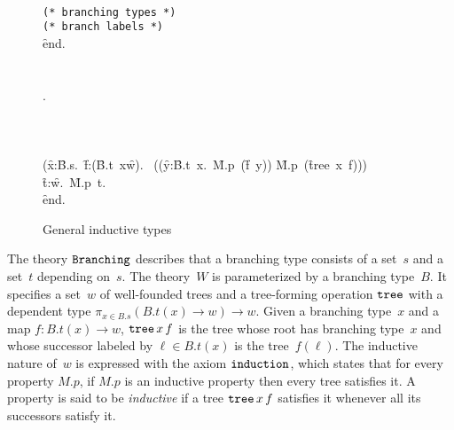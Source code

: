 \begin{figure}
\begin{showInput}
\\
\qquad{} \qquad\mbox{\texttt{(* branching types *)}}\\
\qquad{}\qquad \mbox{\texttt{(* branch labels *)}}\\
\f{end}.\\
\\
\\
\qquad{}.\\
\qquad{}\\
\qquad{}\\
\qquad{}\\
\qquad\qquad(\forall \f{x}{:}\f{B.s}.\ \forall\f{f}{:}{(\f{B.t\ x}\to\f{w})}. \ 
   ((\forall \f{y}{:}\f{B.t\ x}.\ \f{M.p}\ (\f{f\ y})) \Rightarrow \f{M.p}\ (\f{tree\ x\ f}))) \Rightarrow \\
\qquad\qquad\quad\forall \f{t}{:}\f{w}.\ \f{M.p\ t}.\\
\f{end}.
\end{showInput}
  \caption{General inductive types}
  \label{fig:wtype}
\end{figure}
%
The theory $\mathtt{Branching}$ describes that a branching type
consists of a set~$s$ and a set~$t$ depending on~$s$. The theory~$W$ is
parameterized by a branching type~$B$. It specifies a set~$w$ of
well-founded trees and a tree-forming operation $\mathtt{tree}$ with a
dependent type $\pi_{x \in B.s} (B.t(x) \to w) \to w$. Given a
branching type~$x$ and a map $f : B.t(x) \to w$, $\mathtt{tree}\,x\,f$
is the tree whose root has branching type~$x$ and whose successor
labeled by $\ell \in B.t(x)$ is the tree~$f(\ell)$. The inductive
nature of~$w$ is expressed with the axiom $\mathtt{induction}$, which
states that for every property $M.p$, if $M.p$ is an inductive
property then every tree satisfies it. A property is said to be
\emph{inductive} if a tree $\mathtt{tree}\,x\,f$ satisfies it whenever
all its successors satisfy it.

